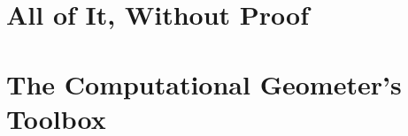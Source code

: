 \frontmatter




\mainmatter



\part{All of It, Without Proof}


\part{The Computational Geometer's Toolbox}\label{sec:preliminaries}


\appendix


%
%

\backmatter
{}
{}


{}
\listoftheorems
